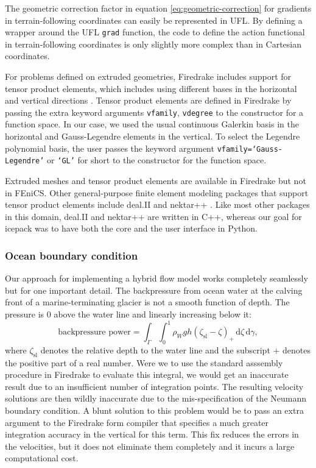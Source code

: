 \documentclass{article}
\theoremstyle{definition}
\theoremstyle{plain}
\newcommand{\ud}{\hspace{2pt}\mathrm{d}}
\begin{document}
The geometric correction factor in equation \eqref{eq:geometric-correction} for gradients in terrain-following coordinates can easily be represented in UFL.
By defining a wrapper around the UFL \texttt{grad} function, the code to define the action functional in terrain-following coordinates is only slightly more complex than in Cartesian coordinates.

For problems defined on extruded geometries, Firedrake includes support for tensor product elements, which includes using different bases in the horizontal and vertical directions \citep{mcrae2016automated}.
Tensor product elements are defined in Firedrake by passing the extra keyword arguments \texttt{vfamily}, \texttt{vdegree} to the constructor for a function space.
In our case, we used the usual continuous Galerkin basis in the horizontal and Gauss-Legendre elements in the vertical.
To select the Legendre polynomial basis, the user passes the keyword argument \texttt{vfamily=`Gauss-Legendre'} or \texttt{`GL'} for short to the constructor for the function space.

Extruded meshes and tensor product elements are available in Firedrake but not in FEniCS.
Other general-purpose finite element modeling packages that support tensor product elements include deal.II and nektar++ \citep{bangerth2007deal, cantwell2015nektar++}.
Like most other packages in this domain, deal.II and nektar++ are written in C++, whereas our goal for icepack was to have both the core and the user interface in Python.

\subsubsection{Ocean boundary condition}

Our approach for implementing a hybrid flow model works completely seamlessly but for one important detail.
The backpressure from ocean water at the calving front of a marine-terminating glacier is not a smooth function of depth.
The pressure is 0 above the water line and linearly increasing below it:
\begin{equation}
    \text{backpressure power} = \int_\Gamma\int_0^1 \rho_Wgh(\zeta_{\text{sl}} - \zeta)_+\ud\zeta\ud\gamma,
    \label{backpressure}
\end{equation}
where $\zeta_{\text{sl}}$ denotes the relative depth to the water line and the subscript $+$ denotes the positive part of a real number.
Were we to use the standard asssembly procedure in Firedrake to evaluate this integral, we would get an inaccurate result due to an insufficient number of integration points.
The resulting velocity solutions are then wildly inaccurate due to the mis-specification of the Neumann boundary condition.
A blunt solution to this problem would be to pass an extra argument to the Firedrake form compiler that specifies a much greater integration accuracy in the vertical for this term.
This fix reduces the errors in the velocities, but it does not eliminate them completely and it incurs a large computational cost.
\end{document}
